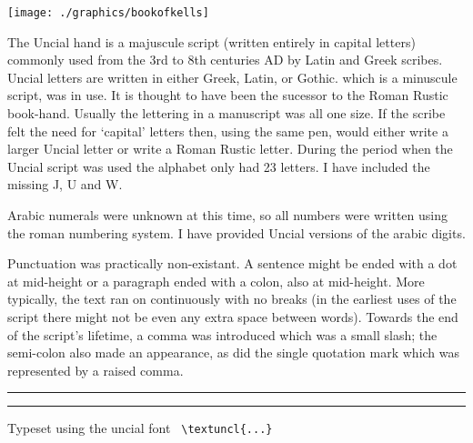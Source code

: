 \clearpage


\begin{multicols}{2}

\texttt{[image: ./graphics/bookofkells]}
\medskip

    The Uncial hand is a majuscule script (written entirely in capital letters) commonly used from the 3rd to 8th centuries AD by Latin and Greek scribes. Uncial letters are written in either Greek, Latin, or Gothic. which is a minuscule script, was in use. It is thought to have been   the sucessor to the Roman Rustic book-hand. Usually the lettering in a manuscript was all one size. If the scribe felt the need
 for `capital' letters then, using the same pen, would either write a larger
 Uncial letter or write a Roman Rustic letter. During the period when the
 Uncial script was used the alphabet only had 23 letters. I have included
 the missing J, U and W.

    Arabic numerals were unknown at this time, so all numbers were written
 using the roman numbering system. I have provided Uncial versions of
 the arabic digits.

    Punctuation was practically non-existant. A sentence might be ended with
 a dot at mid-height or a paragraph ended with a colon, also at mid-height.
 More typically, the text ran on continuously with no breaks (in the earliest 
 uses of the script there might not be even any extra space between words).
 Towards the end of the script's lifetime, a comma was introduced which was a small
 slash; the semi-colon also made an appearance, as did the single quotation 
 mark which was represented by a raised comma.
\bigskip


\hrule
\medskip

{
}
\medskip
\hrule
\smallskip
\hfill\hfill \textsf{Typeset using the uncial font} \verb+ \textuncl{...} +



\end{multicols}
